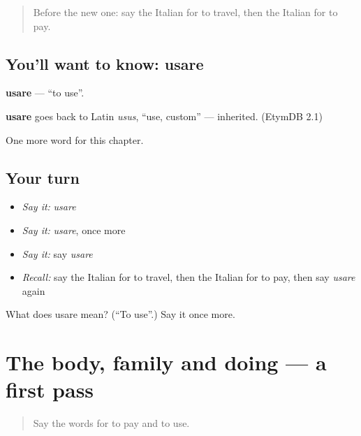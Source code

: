 \begin{quote}
Before the new one: say the Italian for to travel, then the Italian for to pay.
\end{quote}

\subsection*{You'll want to know: usare}
\textbf{usare} — \textquotedblleft{}to use\textquotedblright{}.

\begin{cousinweb}
\textbf{usare} goes back to Latin \emph{usus}, \textquotedblleft{}use, custom\textquotedblright{} — inherited. (EtymDB 2.1)
\end{cousinweb}

\begin{grammarlens}[title={What you've built}]
One more word for this chapter.
\end{grammarlens}

\subsection*{Your turn}
\begin{itemize}
\raggedright
  \item \emph{Say it:} \emph{usare}
  \item \emph{Say it:} \emph{usare}, once more
  \item \emph{Say it:} say \emph{usare}
  \item \emph{Recall:} say the Italian for to travel, then the Italian for to pay, then say \emph{usare} again
\end{itemize}

\begin{tcolorbox}[breakable,colback=teal!4,colframe=teal!35!black,title={Before you move on}]
What does usare mean? (\textquotedblleft{}To use\textquotedblright{}.) Say it once more.
\end{tcolorbox}
\section[(dialogue)]{The body, family and doing — a first pass}

\label{lesson:IT-R60-first-pass-the-body-family-and-doing}



\begin{quote}
Say the words for to pay and to use.
\end{quote}

